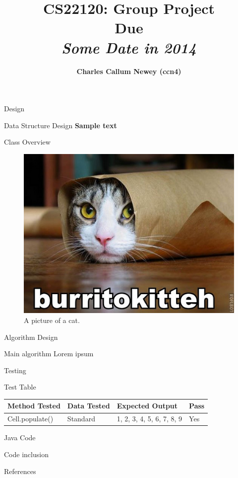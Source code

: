 \documentclass{article}
\title{
\vspace{2in}
\textmd{\textbf{CS22120: Group Project}}\\
\normalsize\vspace{0.1in}\small{Due}\\
\vspace{0.1in}\large{\textit{Some Date in 2014}}
\vspace{3in}
}
\author{\textbf{Charles Callum Newey (ccn4)}}
\date{}
\begin{document}
\maketitle
\newpage
\tableofcontents
\newpage

\begin{section}{Design}
	\begin{subsection}{Data Structure Design}
		\bf{Sample text}
	\end{subsection}
	
	\begin{subsection}{Class Overview}
		\begin{figure}[h!]
			\caption{A picture of a cat.}
			\begin{center}
				\includegraphics[width=0.5\columnwidth]{images/lolcat.jpg}
			\end{center}
		\end{figure}
	\end{subsection}
\end{section}

\begin{section}{Algorithm Design}
	\begin{subsection}{Main algorithm}
		Lorem ipsum
	\end{subsection}
\end{section}

\begin{section}{Testing}
	\begin{subsection}{Test Table}		
		\begin{tabularx}{\linewidth}{| p{4.2cm} | X | X | X |}
			\hline
			{\bf Method Tested} & {\bf Data Tested} & {\bf Expected Output} & {\bf Pass} \\
			\hline
			Cell.populate() & Standard & {1, 2, 3, 4, 5, 6, 7, 8, 9} & Yes \\
			\hline
		\end{tabularx}
	\end{subsection}
\end{section}

\newpage
\begin{section}{Java Code}
	\begin{subsection}{Code inclusion}
		
	\end{subsection}
\end{section}
\newpage

\nocite{LaTeXTemplate}

\newpage
\begin{section}{References}
	
	
\end{section}
\end{document}
